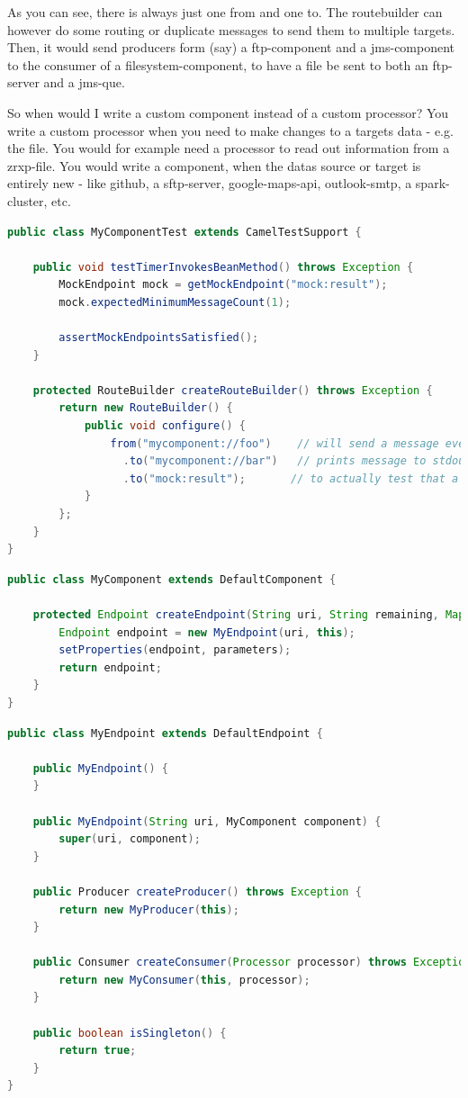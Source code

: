 As you can see, there is always just one from and one to. 
The routebuilder can however do some routing or duplicate messages to send them to multiple targets. Then, it would send producers form (say) a ftp-component and a jms-component to the consumer of a filesystem-component, to have a file be sent to both an ftp-server and a jms-que.


So when would I write a custom component instead of a custom processor?
You write a custom processor when you need to make changes to a targets data - e.g. the file. You would for example need a processor to read out information from a zrxp-file. You would write a component, when the datas source or target is entirely new - like github, a sftp-server, google-maps-api, outlook-smtp, a spark-cluster, etc. 

\begin{lstlisting}[language=java]
public class MyComponentTest extends CamelTestSupport {

    public void testTimerInvokesBeanMethod() throws Exception {
        MockEndpoint mock = getMockEndpoint("mock:result");
        mock.expectedMinimumMessageCount(1);       
        
        assertMockEndpointsSatisfied();
    }

    protected RouteBuilder createRouteBuilder() throws Exception {
        return new RouteBuilder() {
            public void configure() {
                from("mycomponent://foo")    // will send a message every 500ms
                  .to("mycomponent://bar")   // prints message to stdout
                  .to("mock:result");       // to actually test that a message arrives
            }
        };
    }
}
\end{lstlisting}

\begin{lstlisting}[language=java]
public class MyComponent extends DefaultComponent {

    protected Endpoint createEndpoint(String uri, String remaining, Map<String, Object> parameters) throws Exception {
        Endpoint endpoint = new MyEndpoint(uri, this);
        setProperties(endpoint, parameters);
        return endpoint;
    }
}
\end{lstlisting}

\begin{lstlisting}[language=java]
public class MyEndpoint extends DefaultEndpoint {

    public MyEndpoint() {
    }

    public MyEndpoint(String uri, MyComponent component) {
        super(uri, component);
    }

    public Producer createProducer() throws Exception {
        return new MyProducer(this);
    }

    public Consumer createConsumer(Processor processor) throws Exception {
        return new MyConsumer(this, processor);
    }

    public boolean isSingleton() {
        return true;
    }
}
\end{lstlisting}

